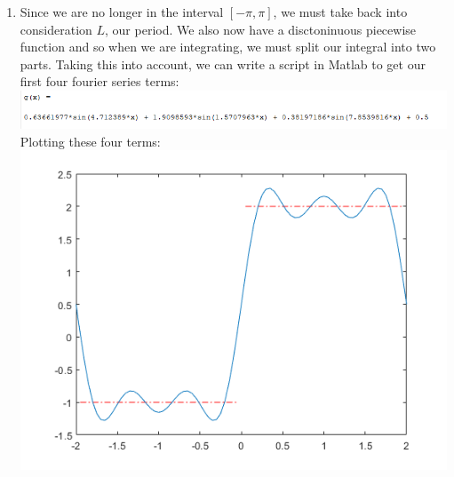 \documentclass{article}
\begin{document}
\begin{enumerate}
    \item Since we are no longer in the interval $[-\pi, \pi]$, we must take back 
    into consideration $L$, our period. We also now have a disctoninuous piecewise 
    function and so when we are integrating, we must split our integral into two 
    parts. Taking this into account, we can write a script in Matlab to get our first
    four fourier series terms: \\
    \includegraphics[scale = .9]{6.png}\\
    Plotting these four terms: \\
    \includegraphics[scale = .7]{6plot.png}
\end{enumerate}
\end{document}
